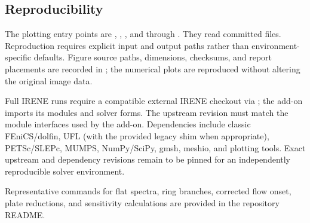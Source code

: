 \subsection{Reproducibility}


The plotting entry points are , , , and  through . They read committed  files. Reproduction requires explicit input and output paths rather than environment-specific defaults. Figure source paths, dimensions, checksums, and report placements are recorded in ; the numerical plots are reproduced without altering the original image data.

Full IRENE runs require a compatible external IRENE checkout via ; the add-on imports its modules and solver forms. The upstream revision must match the module interfaces used by the add-on. Dependencies include classic FEniCS/dolfin, UFL (with the provided legacy shim when appropriate), PETSc/SLEPc, MUMPS, NumPy/SciPy, gmsh, meshio, and plotting tools. Exact upstream and dependency revisions remain to be pinned for an independently reproducible solver environment.

Representative commands for flat spectra, ring branches, corrected flow onset, plate reductions, and sensitivity calculations are provided in the repository README.


\clearpage

